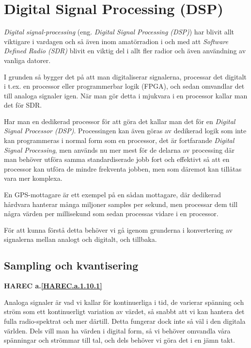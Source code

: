 \section{Digital Signal Processing (DSP)}
\label{DSP}

\emph{Digital signal-processing} (eng. \emph{Digital Signal Processing (DSP)})
har blivit allt viktigare i vardagen och så även inom amatörradion i och med
att \emph{Software Defined Radio (SDR)} blivit en viktig del i allt fler
radior och även användning av vanliga datorer.

I grunden så bygger det på att man digitaliserar signalerna, processar det
digitalt i t.ex. en processor eller programmerbar logik (FPGA), och sedan
omvandlar det till analoga signaler igen.
När man gör detta i mjukvara i en processor kallar man det för SDR.

Har man en dedikerad processor för att göra det kallar man det för en
\emph{Digital Signal Processor (DSP)}.
Processingen kan även göras av dedikerad logik som inte kan programmeras i
normal form som en processor, det är fortfarande
\emph{Digital Signal Processing}, men används nu mer mest för de delarna av
processing där man behöver utföra samma standardiserade jobb fort och effektivt
så att en processor kan utföra de mindre frekventa jobben, men som däremot kan
tillåtas vara mer komplexa.

En GPS-mottagare är ett exempel på en sådan mottagare, där dedikerad hårdvara
hanterar många miljoner samples per sekund, men processar dem till några värden
per millisekund som sedan processas vidare i en processor.

För att kunna förstå detta behöver vi gå igenom grunderna i konvertering av
signalerna mellan analogt och digitalt, och tillbaka.

\subsection{Sampling och kvantisering}
\textbf{HAREC a.\ref{HAREC.a.1.10.1}\label{myHAREC.a.1.10.1}}

Analoga signaler är vad vi kallar för kontinuerliga i tid, de varierar spänning
och ström som ett kontinuerligt variation av värdet, så snabbt att vi kan
hantera det fulla radio-spektrat och mer därtill.
Detta fungerar dock inte så väl i den digitala världen.
Dels vill man ha värden i digital form, så vi behöver omvandla våra spänningar
och strömmar till tal, och dels behöver vi göra det i en jämn takt.

